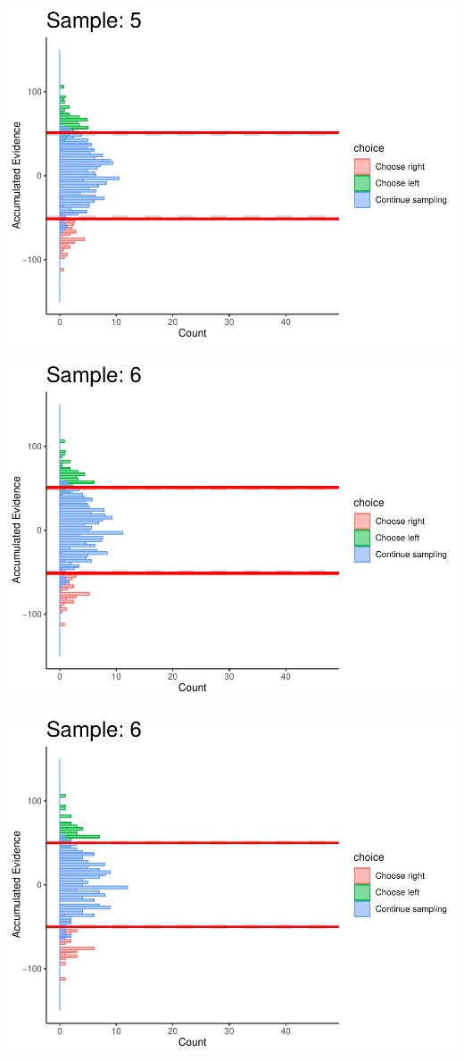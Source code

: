 \documentclass[
]{book}
\begin{document}
\begin{center}\includegraphics[width=0.8\linewidth]{LateNightBayes_files/figure-latex/fixed_dcb-49} \end{center}

\begin{center}\includegraphics[width=0.8\linewidth]{LateNightBayes_files/figure-latex/fixed_dcb-50} \end{center}

\begin{center}\includegraphics[width=0.8\linewidth]{LateNightBayes_files/figure-latex/fixed_dcb-51} \end{center}
\end{document}
